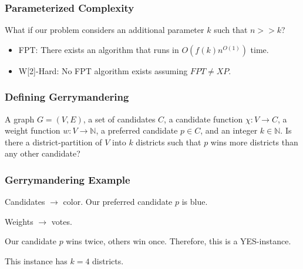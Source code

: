 
\begin{frame}[t]
	\frametitle{Parameterized Complexity}
	What if our problem considers an additional parameter $k$ such that $n >> k$?
	\vspace{1.0cm}
	\begin{itemize}
		\item FPT: There exists an algorithm that runs in $O(f(k)n^{O(1)})$ time.
		\vspace{1.0cm}
		\item W[2]-Hard: No FPT algorithm exists assuming $FPT \neq XP$.
	\end{itemize}
\end{frame}

\begin{frame}[t]
	\frametitle{Defining Gerrymandering}
	\small
	{A graph $G = (V,E)$, a set of candidates $C$, a candidate function $\chi: V \rightarrow C$, a weight function $w: V \rightarrow \mathbb{N}$, a preferred candidate $p \in C$, and an integer $k \in \mathbb{N}$.}
	{Is there a district-partition of $V$ into $k$ districts such that $p$ wins more districts than any other candidate?}

	\begin{figure}
		\begin{center}
			
		\end{center}
	\end{figure}
\end{frame}

\begin{frame}[t]
	\frametitle{Gerrymandering Example}
	\begin{figure}
		\begin{center}
			
		\end{center}
	\end{figure}

	\begin{itemize}
		\item Candidates $\rightarrow$ color. Our preferred candidate $p$ is blue.
		\item Weights $\rightarrow$ votes.
		\onslide<3> {
			\item Our candidate $p$ wins twice, others win once. Therefore, this is a YES-instance.
			\item This instance has $k=4$ districts.
		}
	\end{itemize}
\end{frame}